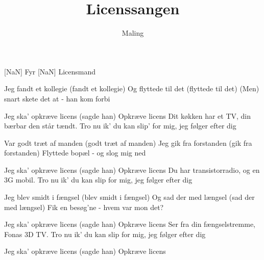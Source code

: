 \documentclass[a4paper,11pt]{article}
\title{Licenssangen}
\author{Maling}
\begin{document}
\maketitle

\begin{roles}
[NaN] Fyr
[NaN] Licensmand
\end{roles}

\begin{song}
 Jeg fandt et kollegie (fandt et kollegie)
Og flyttede til det (flyttede til det)
(Men) snart skete det at - han kom forbi

 Jeg ska' opkræve licens (sagde han)
Opkræve licens
Dit køkken har et TV, din bærbar den står tændt.
Tro nu ik' du kan slip' for mig, jeg følger efter dig

 Var godt træt af manden (godt træt af manden)
Jeg gik fra forstanden (gik fra forstanden)
Flyttede bopæl - og slog mig ned

 Jeg ska' opkræve licens (sagde han)
Opkræve licens
Du har transistorradio, og en 3G mobil.
Tro nu ik' du kan slip for mig, jeg følger efter dig

 Jeg blev smidt i fængsel (blev smidt i fængsel)
Og sad der med længsel (sad der med længsel)
Fik en besøg'ne - hvem var mon det?

 Jeg ska' opkræve licens (sagde han)
Opkræve licens
Ser fra din fængselstremme, Fonas 3D TV.
Tro nu ik' du kan slip for mig, jeg følger efter dig


 Jeg ska' opkræve licens (sagde han)
Opkræve licens

\end{song}
\end{document}
